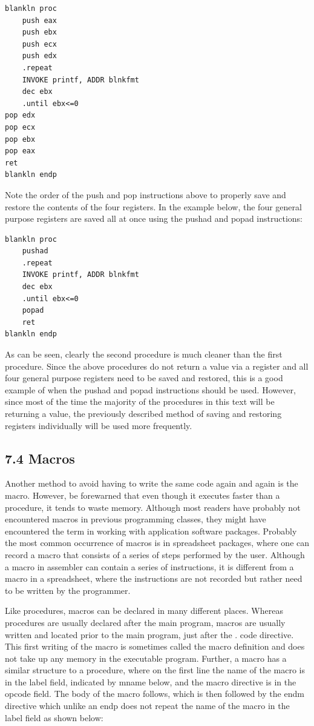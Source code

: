\documentclass[10pt]{article}
\begin{document}
\begin{verbatim}
blankln proc
    push eax
    push ebx
    push ecx
    push edx
    .repeat
    INVOKE printf, ADDR blnkfmt
    dec ebx
    .until ebx<=0
pop edx
pop ecx
pop ebx
pop eax
ret
blankln endp
\end{verbatim}

Note the order of the push and pop instructions above to properly save and restore the contents of the four registers. In the example below, the four general purpose registers are saved all at once using the pushad and popad instructions:

\begin{verbatim}
blankln proc
    pushad
    .repeat
    INVOKE printf, ADDR blnkfmt
    dec ebx
    .until ebx<=0
    popad
    ret
blankln endp
\end{verbatim}

As can be seen, clearly the second procedure is much cleaner than the first procedure. Since the above procedures do not return a value via a register and all four general purpose registers need to be saved and restored, this is a good example of when the pushad and popad instructions should be used. However, since most of the time the majority of the procedures in this text will be returning a value, the previously described method of saving and restoring registers individually will be used more frequently.

\subsection*{7.4 Macros}
Another method to avoid having to write the same code again and again is the macro. However, be forewarned that even though it executes faster than a procedure, it tends to waste memory. Although most readers have probably not encountered macros in previous programming classes, they might have encountered the term in working with application software packages. Probably the most common occurrence of macros is in spreadsheet packages, where one can record a macro that consists of a series of steps performed by the user. Although a macro in assembler can contain a series of instructions, it is different from a macro in a spreadsheet, where the instructions are not recorded but rather need to be written by the programmer.

Like procedures, macros can be declared in many different places. Whereas procedures are usually declared after the main program, macros are usually written and located prior to the main program, just after the . code directive. This first writing of the macro is sometimes called the macro definition and does not take up any memory in the executable program. Further, a macro has a similar structure to a procedure, where on the first line the name of the macro is in the label field, indicated by mname below, and the macro directive is in the opcode field. The body of the macro follows, which is then followed by the endm directive which unlike an endp does not repeat the name of the macro in the label field as shown below:
\end{document}
